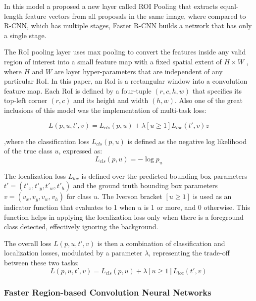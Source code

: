 In this model a proposed a new layer called ROI Pooling that extracts equal-length feature vectors from all proposals in the same image, where 
compared to R-CNN, which has multiple stages, Faster R-CNN builds a network that has only a single stage. 

The RoI pooling layer uses max pooling to convert the features inside any valid region of interest into a small feature map with a fixed spatial 
extent of \(H \times W\) , where $H$ and $W$ are layer hyper-parameters that are independent of any particular RoI. In this paper, an RoI is a rectangular window 
into a convolution feature map. Each RoI is defined by a four-tuple \((r, c, h, w)\) that specifies its top-left corner \((r, c)\) and its height 
and width \((h, w)\). Also one of the great inclusions of this model was the implementation of multi-task loss:

\begin{equation}
    L(p, u, t', v) = L_{cls}(p, u) + \lambda [u \geq 1] L_{loc}(t', v)z   \tag{1}
\end{equation}

,where the classification loss \(L_{cls}(p, u)\) is defined as the negative log likelihood of the true class \(u\), expressed as:
\begin{equation}
    L_{cls}(p, u) = -\log p_u \tag{2}
\end{equation}

The localization loss \(L_{loc}\) is defined over the predicted bounding box parameters \(t' = (t'_x, t'_y, t'_w, t'_h)\) and the ground truth bounding 
box parameters \(v = (v_x, v_y, v_w, v_h)\) for class \(u\). The Iverson bracket \([u \geq 1]\) is used as an indicator function that evaluates to 1 
when \(u\) is 1 or more, and 0 otherwise. This function helps in applying the localization loss only when there is a foreground class detected, 
effectively ignoring the background.

The overall loss \(L(p, u, t', v)\) is then a combination of classification and localization losses, modulated by a parameter \(\lambda\), representing the trade-off between these two tasks:
\begin{equation}
    L(p, u, t', v) = L_{cls}(p, u) + \lambda [u \geq 1] L_{loc}(t', v)   \tag{3}
\end{equation}

\newpage
\subsubsection{Faster Region-based Convolution Neural Networks}

